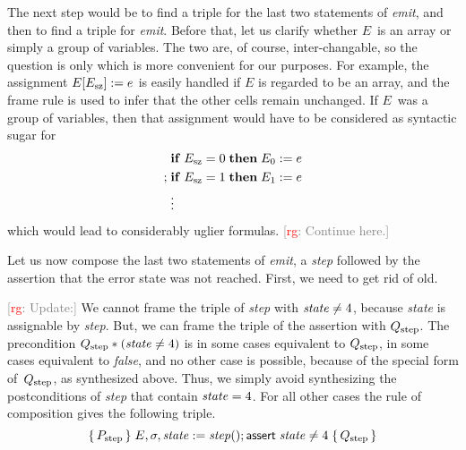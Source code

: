 \documentclass{article} %
\newcommand{\3}[3]{\{\,#1\,\}\;#2\;\{\,#3\,\}}
\newcommand{\noterg}[2]{\textcolor{gray}{[\textcolor{red}{#1}: #2]}}
\newcommand{\rg}[1]{\noterg{rg}{#1}}
\begin{document}
The next step would be to find a triple for the last two statements of {\it emit}, and then to find a triple for {\it emit}.
Before that, let us clarify whether $E$~is an array or simply a group of variables.
The two are, of course, inter-changable, so the question is only which is more convenient for our purposes.
For example, the assignment $E[E_{\rm sz}]:=e$ is easily handled if $E$ is regarded to be an array, and the frame rule is used to infer that the other cells remain unchanged.
If $E$~was a group of variables, then that assignment would have to be considered as syntactic sugar for
\begin{align*}
      &{\bf if}\;E_{\rm sz}=0\;{\bf then}\;E_0:=e \\
  ;\; &{\bf if}\;E_{\rm sz}=1\;{\bf then}\;E_1:=e \\
      &\vdots
\end{align*}
which would lead to considerably uglier formulas.
\rg{Continue here.}

\medskip


Let us now compose the last two statements of {\it emit}, a {\it step\/} followed by the assertion that the error state was not reached.
First, we need to get rid of {\sf old}.

\rg{Update:}
We cannot frame the triple of {\it step\/} with ${\it state}\ne4$, because {\it state\/} is assignable by {\it step}.
But, we can frame the triple of the assertion with $Q_{\rm step}$.
The precondition $Q_{\rm step}*({\it state}\ne4)$ is in some cases equivalent to $Q_{\rm step}$, in some cases equivalent to {\it false\/}, and no other case is possible, because of the special form of~$Q_{\rm step}$, as synthesized above.
Thus, we simply avoid synthesizing the postconditions of {\it step\/} that contain ${\it state}=4$.
For all other cases the rule of composition gives the following triple.
\[\3
  {P_{\rm step}}
  {E,\sigma,{\it state}:={\it step}(); {\sf assert}\;{\it state}\ne4}
  {Q_{\rm step}} \]
\end{document}
